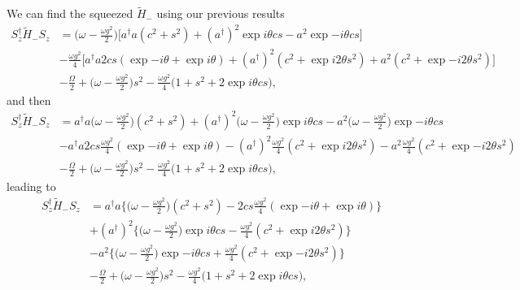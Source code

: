 \documentclass{_mypackages/monograph}
\begin{document}
We can find the squeezed \(\tilde{H}_-\) using our previous results
\begin{equation}
\begin{split}
    S_z^\dagger \tilde{H}_- S_z &= \big( \omega-\frac{\omega g^2}{2}\big) \Bigg[a^\dagger a (c^2 + s^2) + (a^\dagger)^2 \exp{i\theta}cs - a^2 \exp{-i\theta}cs \Bigg] \\
    &- \frac{\omega g^2}{4}\Bigg[ a^\dagger a 2 cs (\exp{-i\theta}+\exp{i\theta}) + (a^\dagger)^2  (c^2 + \exp{i2\theta} s^2) + a^2(c^2 + \exp{-i2\theta}s^2)\Bigg] \\
    &- \frac{\Omega}{2} + \big( \omega-\frac{\omega g^2}{2}\big)s^2 - \frac{\omega g^2}{4}\Big(1 + s^2 + 2\exp{i\theta}cs \Big),
\end{split}
\end{equation}
and then
\begin{equation}
\begin{split}
    S_z^\dagger \tilde{H}_- S_z &=  a^\dagger a \big( \omega-\frac{\omega g^2}{2}\big)(c^2 + s^2) + (a^\dagger)^2\big( \omega-\frac{\omega g^2}{2}\big) \exp{i\theta}cs - a^2 \big( \omega-\frac{\omega g^2}{2}\big)\exp{-i\theta}cs \\
    &-a^\dagger a 2 cs\frac{\omega g^2}{4} (\exp{-i\theta}+\exp{i\theta}) - (a^\dagger)^2 \frac{\omega g^2}{4} (c^2 + \exp{i2\theta} s^2) - a^2 \frac{\omega g^2}{4} (c^2 + \exp{-i2\theta}s^2) \\
    &- \frac{\Omega}{2} + \big( \omega-\frac{\omega g^2}{2}\big)s^2 - \frac{\omega g^2}{4}\Big(1 + s^2 + 2\exp{i\theta}cs \Big), 
\end{split}
\end{equation}
leading to
\begin{equation}
\begin{split}
    S_z^\dagger \tilde{H}_- S_z &=  a^\dagger a \Bigg\{\big( \omega-\frac{\omega g^2}{2}\big)(c^2 + s^2) - 2 cs\frac{\omega g^2}{4} (\exp{-i\theta}+\exp{i\theta}) \Bigg\}  \\
    &+ (a^\dagger)^2\Bigg\{\big( \omega-\frac{\omega g^2}{2}\big) \exp{i\theta}cs - \frac{\omega g^2}{4} (c^2 + \exp{i2\theta} s^2)  \Bigg\} \\
    &- a^2\Bigg\{\big( \omega-\frac{\omega g^2}{2}\big)\exp{-i\theta}cs + \frac{\omega g^2}{4} (c^2 + \exp{-i2\theta}s^2) \Bigg\}  \\
    &- \frac{\Omega}{2} + \big( \omega-\frac{\omega g^2}{2}\big)s^2 - \frac{\omega g^2}{4}\Big(1 + s^2 + 2\exp{i\theta}cs \Big),
\end{split}
\end{equation}
\end{document}
